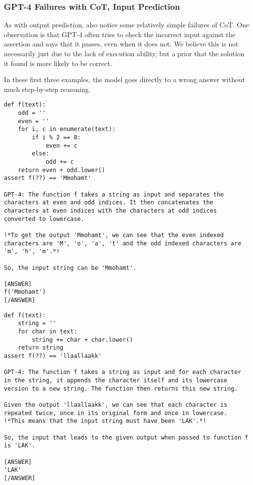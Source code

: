\subsubsection{GPT-4 Failures with CoT, Input Prediction}
As with output prediction, also notice some relatively simple failures of CoT. One observation is that GPT-4 often tries to check the incorrect input against the assertion and says that it passes, even when it does not. We believe this is not necessarily just due to the lack of execution ability, but a prior that the solution it found is more likely to be correct.

In these first three examples, the model goes directly to a wrong answer without much step-by-step reasoning.

\begin{lstlisting}
def f(text):
    odd = ''
    even = ''
    for i, c in enumerate(text):
        if i % 2 == 0:
            even += c
        else:
            odd += c
    return even + odd.lower()
assert f(??) == 'Mmohamt'

GPT-4: The function f takes a string as input and separates the characters at even and odd indices. It then concatenates the characters at even indices with the characters at odd indices converted to lowercase. 

!*To get the output 'Mmohamt', we can see that the even indexed characters are 'M', 'o', 'a', 't' and the odd indexed characters are 'm', 'h', 'm'.*!

So, the input string can be 'Mmohamt'. 

[ANSWER]
f('Mmohamt')
[/ANSWER]
\end{lstlisting}

\begin{lstlisting}
def f(text):
    string = ''
    for char in text:
        string += char + char.lower()
    return string
assert f(??) == 'llaallaakk'

GPT-4: The function f takes a string as input and for each character in the string, it appends the character itself and its lowercase version to a new string. The function then returns this new string.

Given the output 'llaallaakk', we can see that each character is repeated twice, once in its original form and once in lowercase. !*This means that the input string must have been 'LAK'.*!

So, the input that leads to the given output when passed to function f is 'LAK'.

[ANSWER]
'LAK'
[/ANSWER]
\end{lstlisting}

